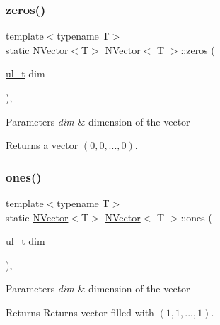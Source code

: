 \mbox{\label{class_n_vector_a6253cef3c39dd9d388bbf7d17069bc51}} 
\subsubsection{\texorpdfstring{zeros()}{zeros()}}
{\footnotesize\ttfamily template$<$typename T$>$ \\
static \mbox{\hyperlink{class_n_vector}{N\+Vector}}$<$T$>$ \mbox{\hyperlink{class_n_vector}{N\+Vector}}$<$ T $>$\+::zeros (\begin{DoxyParamCaption}\item[{\mbox{\hyperlink{group___n_algebra_ga1b140a2034db3f5dfe18a987745df43a}{ul\+\_\+t}}}]{dim }\end{DoxyParamCaption})\hspace{0.3cm}{\ttfamily [inline]}, {\ttfamily [static]}}


\begin{DoxyParams}{Parameters}
{\em dim} & dimension of the vector \\
\hline
\end{DoxyParams}
\begin{DoxyReturn}{Returns}
a {} vector $ (0, 0, ..., 0) $. 
\end{DoxyReturn}
\mbox{\label{class_n_vector_afb6358454a8dfaac4963352843b17bbc}} 
\subsubsection{\texorpdfstring{ones()}{ones()}}
{\footnotesize\ttfamily template$<$typename T$>$ \\
static \mbox{\hyperlink{class_n_vector}{N\+Vector}}$<$T$>$ \mbox{\hyperlink{class_n_vector}{N\+Vector}}$<$ T $>$\+::ones (\begin{DoxyParamCaption}\item[{\mbox{\hyperlink{group___n_algebra_ga1b140a2034db3f5dfe18a987745df43a}{ul\+\_\+t}}}]{dim }\end{DoxyParamCaption})\hspace{0.3cm}{\ttfamily [inline]}, {\ttfamily [static]}}


\begin{DoxyParams}{Parameters}
{\em dim} & dimension of the vector \\
\hline
\end{DoxyParams}
\begin{DoxyReturn}{Returns}
Returns vector filled with {} $ (1, 1, ..., 1) $. 
\end{DoxyReturn}
\mbox{\label{class_n_vector_add6abbdea5f58e6887367860aa0f619d}} 
